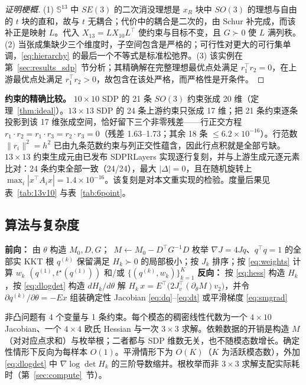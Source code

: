 \begin{proof}[证明梗概]
(1) $\mathbb{S}^{13}$ 中 $SE(3)$ 的二次消没理想是 $x_R$ 块中 $SO(3)$ 的理想与自由的 $t$ 块的直和，故与 $t$ 无耦合；代价中的耦合是二次的，由 Schur 补完成，而该补正是映射 $L$。代入 $X_{13}=LX_{10}L^\top$ 使约束与目标不变，且 $G\succ0$ 使 $L$ 满列秩。(2) 当张成集缺少三个维度时，子空间包含是严格的；可行性对更大的可行集单调，\eqref{eq:hierarchy} 的最后一个不等式是标准松弛界。(3) 该实例在第~\ref{sec:results_sdp}~节分析；其精确解在完整理想最优点处满足 $r_1^\top r_2=0$，在上游最优点处满足 $r_1^\top r_2>0$，故包含在该处严格，而严格性是开条件。
\end{proof}

\textbf{约束的精确比较。} $10\times10$ SDP 的 21 条 $SO(3)$ 约束张成 20 维（定理~\ref{thm:ideal}）。$13\times13$ SDP 的 24 条上游约束只张成 17 维；把 21 条约束逐条投影到该 17 维张成空间，恰好留下三个非零残差——行正交方程 $r_1\cdot r_2=r_1\cdot r_3=r_2\cdot r_3=0$（残差 1.63--1.73；其余 18 条 $\le6.2\times10^{-16}$）。行范数 $\|r_i\|^2=h^2$ 已由九条范数约束与列正交性蕴含，因此行点积就是全部亏缺。$13\times13$ 约束生成元由已发布 SDPRLayers 实现逐行复刻，并与上游生成元逐元素比对：24 条约束全部一致（24/24），最大 $|\Delta|=0$，且在随机旋转上 $\max_i|x^\top A_i x|=1.4\times10^{-16}$。该复刻是对本文重实现的检验。度量后果见表~\ref{tab:13v10} 与表~\ref{tab:6point}。

\subsection{算法与复杂度}\label{sec:algorithm}

\begin{algorithm}[t]
\caption{\textsc{Laplace-QPEPLayer} 的前向与反向（单个批元素）。}
\label{alg:layer}
\begin{algorithmic}[1]
\State \textbf{前向：}
\State 由 $\theta$ 构造 $M_0,D,G$；\ $M\gets M_0-D^\top G^{-1}D$
\State 枚举 $\nabla J=4Jq$、$q^\top q=1$ 的全部实 KKT 根 $q^{(k)}$
\State 保留满足 $H_k\succ0$ 的局部极小；按 $J_k$ 排序；按 \eqref{eq:weights} 计算 $w_k$
\State \Return $(q^{(1)},t^\star(q^{(1)}))$ 和/或 $\{(q^{(k)},w_k)\}_{k=1}^{K}$
\State \textbf{反向：}
  \State 按 \eqref{eq:hess} 构造 $H_k$，按 \eqref{eq:dlogdet} 构造 $dH_k/d\theta$
  \State 解 $H_k\,x=E^\top\big(2J_v^\top(\partial_\theta M)v_2\big)$，并令 $\partial q^{(k)}/\partial\theta=-Ex$
\EndFor
\State 组装确定性 Jacobian \eqref{eq:dq}--\eqref{eq:dt} 或平滑梯度 \eqref{eq:smgrad}
\end{algorithmic}
\end{algorithm}

非凸问题有 4 个变量与 1 条约束。每个模态的稠密线性代数为一个 $4\times10$ Jacobian、一个 $4\times4$ 欧氏 Hessian 与一次 $3\times3$ 求解。依赖数据的开销是构造 $M$（对对应点求和）与枚举根；二者都与 SDP 维数无关，也不随模态数增长。确定性情形下反向为每样本 $O(1)$。平滑情形下为 $O(K)$（$K$ 为活跃模态数），外加 \eqref{eq:dlogdet} 中 $\nabla\log\det H_k$ 的三阶导数缩并。根枚举而非 $3\times3$ 求解支配实际耗时（第~\ref{sec:compute}~节）。
